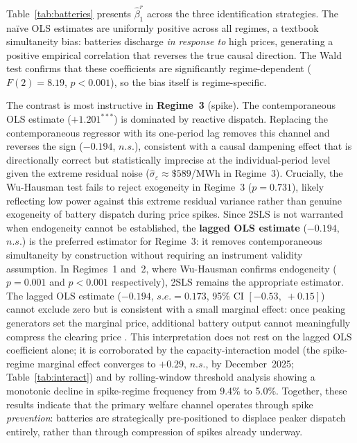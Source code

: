 \documentclass[12pt,a4paper]{article}
\begin{document}
Table~\ref{tab:batteries} presents $\hat\beta_1^r$ across the three
identification strategies.  The na\"ive OLS estimates are uniformly positive
across all regimes, a textbook simultaneity bias: batteries discharge
\textit{in response to} high prices, generating a positive empirical correlation
that reverses the true causal direction.  The Wald test confirms that these
coefficients are significantly regime-dependent ($F(2) = 8.19$, $p < 0.001$),
so the bias itself is regime-specific.

The contrast is most instructive in \textbf{Regime~3} (spike).  The
contemporaneous OLS estimate ($+1.201^{***}$) is dominated by reactive dispatch.
Replacing the contemporaneous regressor with its one-period lag removes this
channel and reverses the sign ($-0.194$, $n.s.$), consistent with a causal
dampening effect that is directionally correct but statistically imprecise at the
individual-period level given the extreme residual noise
($\hat\sigma_\varepsilon \approx \$589$/MWh in Regime~3).  Crucially, the
Wu-Hausman test fails to reject exogeneity in Regime~3 ($p = 0.731$), likely
reflecting low power against this extreme residual variance rather than genuine
exogeneity of battery dispatch during price spikes.  Since 2SLS is not warranted
when endogeneity cannot be established, the \textbf{lagged OLS estimate}
($-0.194$, $n.s.$) is the preferred estimator for Regime~3: it removes
contemporaneous simultaneity by construction without requiring an instrument
validity assumption.  In Regimes~1 and~2, where Wu-Hausman confirms endogeneity
($p = 0.001$ and $p < 0.001$ respectively), 2SLS remains the appropriate
estimator.  The lagged OLS estimate ($-0.194$, $s.e.=0.173$, 95\% CI
$[-0.53,\;+0.15]$) cannot exclude zero but is consistent with a small marginal
effect: once peaking generators set the marginal price, additional battery
output cannot meaningfully compress the clearing price
\parencite{joskow2011comparing}.  This interpretation does not rest on the
lagged OLS coefficient alone; it is corroborated by the capacity-interaction
model (the spike-regime marginal effect
converges to $+0.29$, $n.s.$, by December~2025; Table~\ref{tab:interact}) and
by rolling-window threshold analysis showing a monotonic decline in spike-regime
frequency from 9.4\% to 5.0\%.  Together, these results indicate that the
primary welfare channel operates through spike \textit{prevention}: batteries
are strategically pre-positioned to displace peaker dispatch entirely, rather
than through compression of spikes already underway.
\end{document}
